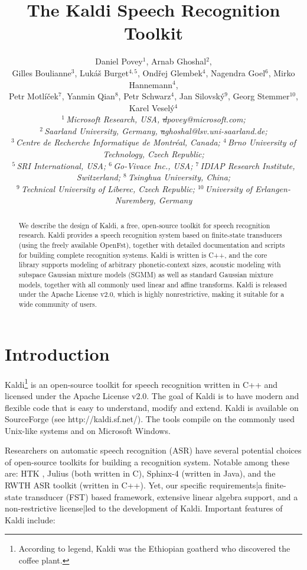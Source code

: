 \documentclass[10pt,conference,letterpaper]{IEEEtran}
\title{The Kaldi Speech Recognition Toolkit}
\author{{Daniel Povey}$^1$, {Arnab Ghoshal}$^2$, \\
  {Gilles Boulianne}$^3$, {Luk\'{a}\v{s} Burget}$^{4,5}$, {Ond\v{r}ej 
    Glembek}$^4$, {Nagendra Goel}$^6$, {Mirko Hannemann}$^4$, \\
  {Petr Motl\'{i}\v{c}ek}$^7$, {Yanmin Qian}$^8$, {Petr Schwarz}$^4$, 
  {Jan Silovsk\'{y}}$^9$, {Georg Stemmer}$^{10}$, {Karel Vesel\'{y}}$^4$
\vspace{1.6mm}\\
\fontsize{10}{10}\selectfont\itshape
   $^1$\,Microsoft Research, USA, {\st dpovey@microsoft.com}; \\
   $^2$\,Saarland University, Germany, {\st aghoshal@lsv.uni-saarland.de}; \\
   $^3$\,Centre de Recherche Informatique de Montr\'{e}al, Canada; 
   $^4$\,Brno University of Technology, Czech Republic; \\
   $^5$\,SRI International, USA;
   $^6$\,Go-Vivace Inc., USA; $^7$\,IDIAP Research Institute, Switzerland; 
   $^8$\,Tsinghua University, China; \\
   $^9$\,Technical University of Liberec, Czech Republic; 
   $^{10}$\,University of Erlangen-Nuremberg, Germany
}
\begin{document}
\maketitle
%
\begin{abstract} 
We describe the design of Kaldi, a free, open-source toolkit for speech 
recognition research. Kaldi provides a speech recognition system based on 
finite-state transducers (using the freely available OpenFst), together with 
detailed documentation and scripts for building complete 
recognition systems. Kaldi is written is C++, and the core library supports 
modeling of arbitrary phonetic-context sizes, acoustic modeling with subspace 
Gaussian mixture models (SGMM) as well as standard Gaussian mixture models, 
together with all commonly used linear and affine transforms. Kaldi is released 
under the Apache License v2.0, which is highly nonrestrictive, making it 
suitable for a wide community of users.
\end{abstract}

\section{Introduction}
\label{sec:intro}
Kaldi\footnote{According to legend, Kaldi was the Ethiopian goatherd who 
discovered the coffee plant.} is an open-source toolkit for speech recognition 
written in C++ and licensed under the Apache License v2.0. 
The goal of Kaldi is to have modern and flexible code that is easy to 
understand, modify and extend. Kaldi is available on SourceForge (see 
http://kaldi.sf.net/).  The tools compile on the commonly used Unix-like 
systems and on Microsoft Windows.

Researchers on automatic speech recognition (ASR) have several potential 
choices of open-source toolkits for building a recognition system. Notable 
among these are: HTK \cite{htkbook}, Julius \cite{julius} (both written in C), 
Sphinx-4 \cite{sphinx} (written in Java), and the RWTH ASR toolkit \cite{rwth}
(written in C++). Yet, our specific requirements|a finite-state transducer 
(FST) based framework, extensive linear algebra support, and a non-restrictive 
license|led to the development of Kaldi. Important features of Kaldi include:

\end{document}
